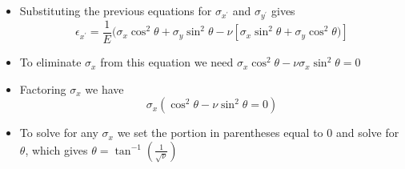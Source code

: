 \documentclass[12pt, oneside]{article}
\begin{document}
\begin{enumerate}
\begin{itemize}
				\item Substituting the previous equations for $\sigma_{x^\prime}$ and $\sigma_{y^\prime}$ gives
					\[ \epsilon_{x^\prime} = \frac{1}{E}( \sigma_x \cos^2\theta + \sigma_y \sin^2 \theta - \nu [\sigma_x \sin^2\theta + \sigma_y \cos^2 \theta)]\]
				\item To eliminate $\sigma_x$ from this equation we need $\sigma_x \cos^2\theta - \nu \sigma_x \sin^2 \theta = 0$
				\item Factoring $\sigma_x$ we have 
					\[ \sigma_x ( \cos^2\theta - \nu \sin^2\theta = 0 )\]
				\item To solve for any $\sigma_x$ we set the portion in parentheses equal to 0 and solve for $\theta$, which gives $\theta = \tan^{-1}\left( \frac{1}{\sqrt{\nu}} \right)$
			\end{itemize}

\end{enumerate}
\end{document}
